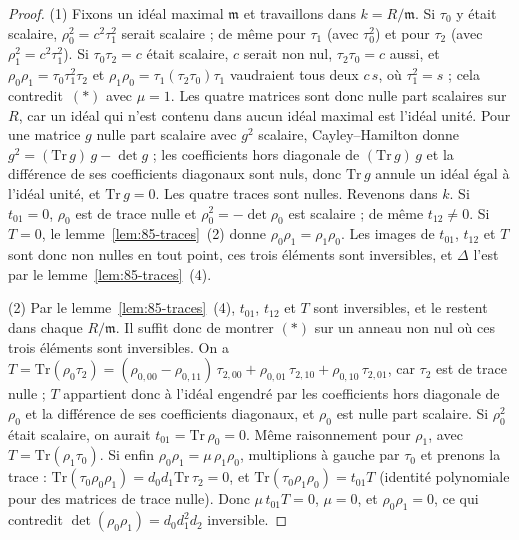 \begin{proof}
(1) Fixons un idéal maximal $\mathfrak m$ et travaillons dans $k = R/\mathfrak m$. Si $\tau_0$ y était scalaire, $\rho_0^2 = c^2\tau_1^2$ serait scalaire ; de même pour $\tau_1$ (avec $\tau_0^2$) et pour $\tau_2$ (avec $\rho_1^2 = c^2\tau_1^2$). Si $\tau_0\tau_2 = c$ était scalaire, $c$ serait non nul, $\tau_2\tau_0 = c$ aussi, et $\rho_0\rho_1 = \tau_0\tau_1^2\tau_2$ et $\rho_1\rho_0 = \tau_1(\tau_2\tau_0)\tau_1$ vaudraient tous deux $c\,s$, où $\tau_1^2 = s$ ; cela contredit~$(*)$ avec $\mu = 1$. Les quatre matrices sont donc nulle part scalaires sur $R$, car un idéal qui n'est contenu dans aucun idéal maximal est l'idéal unité. Pour une matrice $g$ nulle part scalaire avec $g^2$ scalaire, Cayley--Hamilton donne $g^2 = (\mathrm{Tr}\,g)\,g - \det g$ ; les coefficients hors diagonale de $(\mathrm{Tr}\,g)\,g$ et la différence de ses coefficients diagonaux sont nuls, donc $\mathrm{Tr}\,g$ annule un idéal égal à l'idéal unité, et $\mathrm{Tr}\,g = 0$. Les quatre traces sont nulles. Revenons dans $k$. Si $t_{01} = 0$, $\rho_0$ est de trace nulle et $\rho_0^2 = -\det\rho_0$ est scalaire ; de même $t_{12} \neq 0$. Si $T = 0$, le lemme~\ref{lem:85-traces}~(2) donne $\rho_0\rho_1 = \rho_1\rho_0$. Les images de $t_{01}$, $t_{12}$ et $T$ sont donc non nulles en tout point, ces trois éléments sont inversibles, et $\Delta$ l'est par le lemme~\ref{lem:85-traces}~(4).

(2) Par le lemme~\ref{lem:85-traces}~(4), $t_{01}$, $t_{12}$ et $T$ sont inversibles, et le restent dans chaque $R/\mathfrak m$. Il suffit donc de montrer $(*)$ sur un anneau non nul où ces trois éléments sont inversibles. On a $T = \mathrm{Tr}(\rho_0\tau_2) = (\rho_{0,00} - \rho_{0,11})\,\tau_{2,00} + \rho_{0,01}\,\tau_{2,10} + \rho_{0,10}\,\tau_{2,01}$, car $\tau_2$ est de trace nulle ; $T$ appartient donc à l'idéal engendré par les coefficients hors diagonale de $\rho_0$ et la différence de ses coefficients diagonaux, et $\rho_0$ est nulle part scalaire. Si $\rho_0^2$ était scalaire, on aurait $t_{01} = \mathrm{Tr}\,\rho_0 = 0$. Même raisonnement pour $\rho_1$, avec $T = \mathrm{Tr}(\rho_1\tau_0)$. Si enfin $\rho_0\rho_1 = \mu\,\rho_1\rho_0$, multiplions à gauche par $\tau_0$ et prenons la trace : $\mathrm{Tr}(\tau_0\rho_0\rho_1) = d_0 d_1 \mathrm{Tr}\,\tau_2 = 0$, et $\mathrm{Tr}(\tau_0\rho_1\rho_0) = t_{01} T$ (identité polynomiale pour des matrices de trace nulle). Donc $\mu\,t_{01}T = 0$, $\mu = 0$, et $\rho_0\rho_1 = 0$, ce qui contredit $\det(\rho_0\rho_1) = d_0 d_1^2 d_2$ inversible.
\end{proof}

